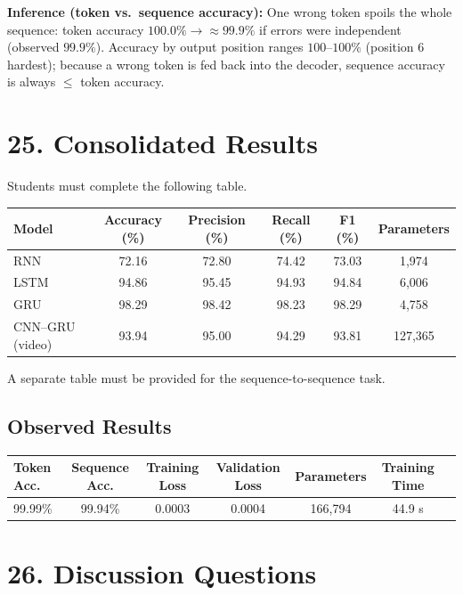 \documentclass[10pt]{article}
\begin{document}
\textbf{Inference (token vs.\ sequence accuracy):} One wrong token spoils
the whole sequence: token accuracy $100.0\%\rightarrow\approx99.9\%$ if
errors were independent (observed $99.9\%$). Accuracy by output position
ranges $100$--$100\%$ (position 6 hardest); because a wrong token is fed
back into the decoder, sequence accuracy is always $\le$ token accuracy.

\section*{25. Consolidated Results}

Students must complete the following table.

\begin{center}
\begin{tabular}{|l|c|c|c|c|c|}
\hline
Model & Accuracy (\%) & Precision (\%) & Recall (\%) & F1 (\%) & Parameters\\
\hline
RNN & 72.16 & 72.80 & 74.42 & 73.03 & 1,974\\
LSTM & 94.86 & 95.45 & 94.93 & 94.84 & 6,006\\
GRU & 98.29 & 98.42 & 98.23 & 98.29 & 4,758\\
CNN--GRU (video) & 93.94 & 95.00 & 94.29 & 93.81 & 127,365\\
\hline
\end{tabular}
\end{center}

A separate table must be provided for the sequence-to-sequence task.

\subsection*{Observed Results}

\begin{center}
\begin{tabular}{|l|c|c|c|c|c|c|}
\hline
Token Acc. & Sequence Acc. & Training Loss & Validation Loss & Parameters & Training Time\\
\hline
99.99\% & 99.94\% & 0.0003 & 0.0004 & 166,794 & 44.9 s\\
\hline
\end{tabular}
\end{center}

\section*{26. Discussion Questions}
\end{document}

